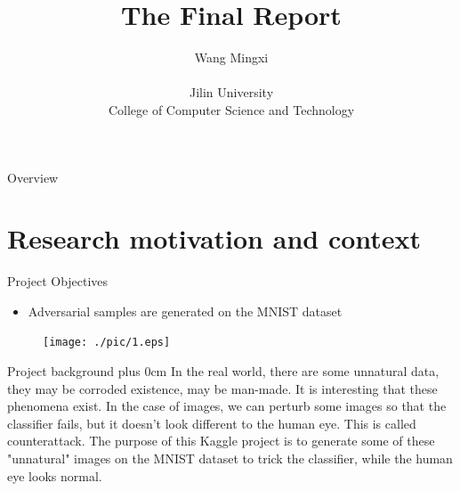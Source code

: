 \documentclass[
 size=14pt,
 paper=smartboard,  %
 mode=present, 		%
 display=slides, 	%
 style=tuliplab,  	%
 pauseslide,
 fleqn,leqno]{powerdot}
\title{The Final Report}
\author{
Wang Mingxi
\\
\\Jilin University
\\College of Computer Science and Technology
}
\date{\gitCommitterDate}
\renewcommand{\raggedright}{\leftskip=0pt \rightskip=0pt plus 0cm}
\begin{document}
\maketitle



\begin{slide}[toc=,bm=]{Overview}
\tableofcontents[content=currentsection,type=1]
\end{slide}


\section{Research motivation and context}

\begin{slide}{Project Objectives}

\begin{itemize}
\item Adversarial samples are generated on the MNIST dataset
\end{itemize}

\begin{center}
	\begin{figure}[htbp]
		\texttt{[image: ./pic/1.eps]}
	\end{figure}
\end{center}

\end{slide}

\begin{slide}{Project background}
\raggedright
In the real world, there are some unnatural data, they may be corroded existence, may be man-made.
It is interesting that these phenomena exist.
In the case of images, we can perturb some images so that the classifier fails, but it doesn't look different to the human eye.
This is called counterattack.
The purpose of this Kaggle project is to generate some of these "unnatural" images on the MNIST dataset to trick the classifier, while the human eye looks normal.
\end{slide}
\end{document}
